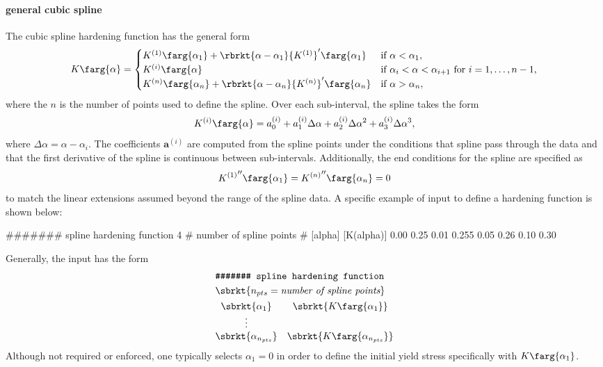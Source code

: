\paragraph{general cubic spline}
The cubic spline hardening function has the general form
\begin{equation}
K\farg{\alpha} =
\begin{cases}
K^{(1)}\farg{\alpha_{1}} + \rbrkt{\alpha - \alpha_{1}} {K^{(1)}}'\farg{\alpha_{1}}
& \textrm{if~} \alpha < \alpha_{1}, \\
K^{(i)}\farg{\alpha}
& \textrm{if~} \alpha_{i} < \alpha <  \alpha_{i+1} \textrm{~for~} i=1,\ldots,n-1, \\
K^{(n)}\farg{\alpha_{n}} + \rbrkt{\alpha - \alpha_{n}} {K^{(n)}}'\farg{\alpha_{n}}
& \textrm{if~}\alpha > \alpha_{n},
\end{cases}	
\end{equation}
where the $n$ is the number of points used to define the spline. Over 
each sub-interval, the spline takes the form
\begin{equation}
K^{(i)}\farg{\alpha} = a_{0}^{(i)} 
+ a_{1}^{(i)} \Delta \alpha 
+ a_{2}^{(i)} \Delta \alpha^{2} 
+ a_{3}^{(i)} \Delta \alpha^{3},
\end{equation}	
where $\Delta \alpha = \alpha - \alpha_{i}$. The coefficients 
$\mathbf{a}^{(i)}$ 
are computed from the spline points under the conditions that 
spline pass through the data and that the first derivative of the 
spline is continuous between sub-intervals. Additionally, the end 
conditions for the spline are specified as 
\begin{equation}
{K^{(1)}}''\farg{\alpha_{1}} = {K^{(n)}}''\farg{\alpha_{n}} = 0
\end{equation}
to match the linear extensions assumed beyond the range of the spline 
data. A specific example of input to define a hardening function is 
shown below:
\begin{inputfile}
####### spline hardening function
4     # number of spline points
# [alpha] [K(alpha)]
0.00  0.25
0.01  0.255
0.05  0.26
0.10  0.30	
\end{inputfile}
Generally, the input has the form
\begin{align}
& \texttt{\#\#\#\#\#\#\# spline hardening function} \notag \\
& \sbrkt{n_{pts} = \textit{number of spline points}} \notag \\
& \begin{matrix}
\sbrkt{\alpha_{1}} & \sbrkt{K\farg{\alpha_{1}}} \\
\vdots \\
\sbrkt{\alpha_{n_{pts}}} & \sbrkt{K\farg{\alpha_{n_{pts}}}}
\end{matrix} \notag
\end{align}
Although not required or enforced, one typically selects
$\alpha_{1} = 0$ in order to define the initial yield 
stress specifically with $K\farg{\alpha_{1}}$.

